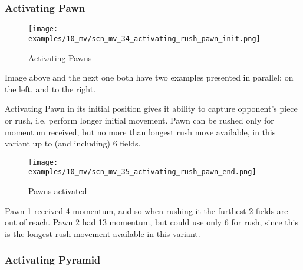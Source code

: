 \clearpage %

\subsubsection*{Activating Pawn}
\label{sec:Miranda's veil/Wave/Cascading Waves/Activating Pawn}

\vspace*{-1.4\baselineskip}
\noindent
\begin{figure}[!h]
\texttt{[image: examples/10\_mv/scn\_mv\_34\_activating\_rush\_pawn\_init.png]}
\vspace*{-1.3\baselineskip}
\caption{Activating Pawns}
\label{fig:scn_mv_34_activating_rush_pawn_init}
\end{figure}

\vspace*{-0.3\baselineskip}
Image above and the next one both have two examples presented in parallel; on the left,
and to the right.

Activating Pawn in its initial position gives it ability to capture opponent's
piece or rush, i.e. perform longer initial movement. Pawn can be rushed only for
momentum received, but no more than longest rush move available, in this variant
up to (and including) 6 fields.

\clearpage %

\vspace*{-2.1\baselineskip}
\noindent
\begin{figure}[!h]
\texttt{[image: examples/10\_mv/scn\_mv\_35\_activating\_rush\_pawn\_end.png]}
\caption{Pawns activated}
\label{fig:scn_mv_35_activating_rush_pawn_end}
\end{figure}

Pawn 1 received 4 momentum, and so when rushing it the furthest 2 fields are out
of reach. Pawn 2 had 13 momentum, but could use only 6 for rush, since this is the
longest rush movement available in this variant.

\clearpage %

\subsubsection*{Activating Pyramid}
\label{sec:Miranda's veil/Wave/Cascading Waves/Activating Pyramid}

